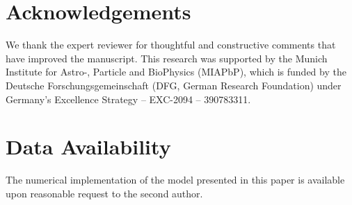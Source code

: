 \documentclass[useAMS,usenatbib]{mn2e}
\newcommand{\rev}{ }
\begin{document}
\section*{Acknowledgements}

{\rev We thank the expert reviewer for thoughtful and constructive comments that have improved the manuscript}. This research was supported by the Munich Institute for Astro-, Particle and BioPhysics (MIAPbP), which is funded by the Deutsche Forschungsgemeinschaft (DFG, German Research Foundation) under Germany's Excellence Strategy – EXC-2094 – 390783311.

\section*{Data Availability}

The numerical implementation of the model presented in this paper is available upon reasonable request to the second author.
\end{document}
